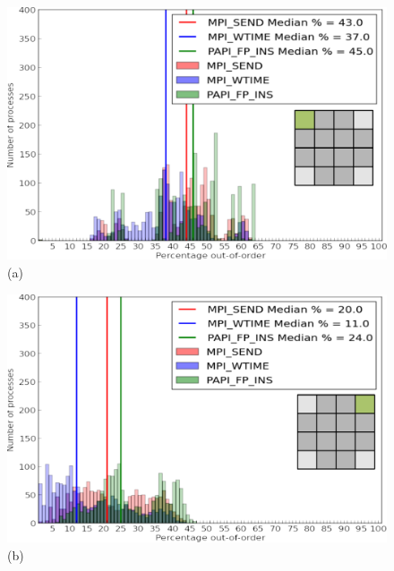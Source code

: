 \begin{figure}[!htb]
    \begin{minipage}[b]{0.5\linewidth}
        \centering
        \includegraphics[width=0.95\linewidth]{chapter_3_figures/hist_nodes1_procs16_particles1000_cycles10_bufferSize5.pdf} 
        \\ (a) \\
    \end{minipage}
    \begin{minipage}[b]{0.5\linewidth}
        \centering
        \includegraphics[width=0.95\linewidth]{chapter_3_figures/hist_nodes1_procs16_particles1000_cycles10_bufferSize5000.pdf}
        \\ (b) \\
    \end{minipage}
    \begin{minipage}[b]{0.5\linewidth}
        \centering

\end{minipage}
\end{figure}
